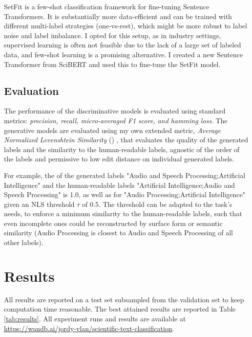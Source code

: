 \documentclass[11pt,letterpaper]{article}
\begin{document}
SetFit \cite{tunstall2022efficient} is a few-shot classification framework for fine-tuning Sentence Transformers. It is substantially more data-efficient and can be trained with different multi-label strategies (one-vs-rest), which might be more robust to label noise and label imbalance. I opted for this setup, as in industry settings, supervised learning is often not feasible due to the lack of a large set of labeled data, and few-shot learning is a promising alternative. I created a new Sentence Transformer from SciBERT and used this to fine-tune the SetFit model.

\subsection{Evaluation}

The performance of the discriminative models is evaluated using standard metrics: \textit{precision, recall, micro-averaged F1 score, and hamming loss}.
The generative models are evaluated using my own extended metric, \textit{Average Normalized Levenshtein Similarity} (\ANLS) \cite{VanLandeghem2023dude}, that evaluates the quality of the generated labels and the similarity to the human-readable labels, agnostic of the order of the labels and permissive to low edit distance on individual generated labels.

For example, the \ANLS of the generated labels "Audio and Speech Processing;Artificial Intelligence" and the human-readable labels "Artificial Intelligence;Audio and Speech Processing" is 1.0, as well as for "Audio Processing;Artificial Intelligence" given an NLS threshold $\tau$ of 0.5. The threshold can be adapted to the task's needs, \eg to enforce a minimum similarity to the human-readable labels, such that even incomplete ones could be reconstructed by surface form or semantic similarity (\eg Audio Processing is closest to Audio and Speech Processing of all other labels).

\section{Results}

All results are reported on a test set subsampled from the validation set to keep computation time reasonable. The best attained results are reported in Table \ref{tab:results}.
All experiment runs and results are available at \url{https://wandb.ai/jordy-vlan/scientific-text-classification}.
\end{document}
